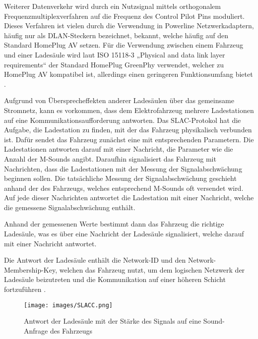 Weiterer Datenverkehr wird durch ein Nutzsignal mittels orthogonalem Frequenzmultiplexverfahren auf die Frequenz des Control Pilot Pins moduliert. Dieses Verfahren ist vielen durch die Verwendung in Powerline Netzwerkadaptern, häufig nur als DLAN-Steckern bezeichnet, bekannt, welche häufig auf den Standard HomePlug AV setzen. Für die Verwendung zwischen einem Fahrzeug und einer Ladesäule wird laut ISO 15118-3 „Physical and data link layer requirements“ der Standard HomePlug GreenPhy verwendet, welcher zu HomePlug AV kompatibel ist, allerdings einen geringeren Funktionsumfang bietet \cite[S. 302]{homepluggreenphy}.


Aufgrund von Übersprecheffekten anderer Ladesäulen über das gemeinsame Stromnetz, kann es vorkommen, dass dem Elektrofahrzeug mehrere Ladestationen auf eine Kommunikationsaufforderung antworten. Das SLAC-Protokol hat die Aufgabe, die Ladestation zu finden, mit der das Fahrzeug physikalisch verbunden ist. Dafür sendet das Fahrzeug zunächst eine  mit entsprechenden Parametern. Die Ladestationen antworten darauf mit einer  Nachricht, die Parameter wie die Anzahl der M-Sounds angibt. Daraufhin signalisiert das Fahrzeug mit  Nachrichten, dass die Ladestationen mit der Messung der Signalabschwächung beginnen sollen. Die tatsächliche Messung der Signalabschwächung geschieht anhand der  des Fahrzeugs, welches entsprechend M-Sounds oft versendet wird. Auf jede dieser Nachrichten antwortet die Ladestation mit einer  Nachricht, welche die gemessene Signalabschwächung enthält. 

Anhand der gemessenen Werte bestimmt dann das Fahrzeug die richtige Ladesäule, was es über eine  Nachricht der Ladesäule signalisiert, welche darauf mit einer  Nachricht antwortet. 

Die Antwort der Ladesäule enthält die Network-ID und den Network-Membership-Key, welchen das Fahrzeug nutzt, um dem logischen Netzwerk der Ladesäule beizutreten und die Kommunikation auf einer höheren Schicht fortzuführen \cite[S. 310]{homepluggreenphy}.

\begin{figure}
	\centering
	\texttt{[image: images/SLACC.png]}
	\caption{Antwort der Ladesäule mit der Stärke des Signals auf eine Sound-Anfrage des Fahrzeugs}
	\label{fig:slacc}
\end{figure}

